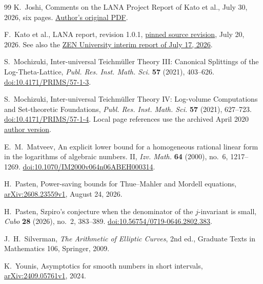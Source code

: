 \documentclass[11pt]{amsart}
\theoremstyle{definition}
\theoremstyle{remark}
\begin{document}
\begin{thebibliography}{99}
K.~Joshi, Comments on the LANA Project Report of Kato et al.,
July 30, 2026, six pages.
\href{https://sites.arizona.edu/kirti-joshi/files/2026/07/Comments-on-the-LANA-Project-Report-of-Kato-et-al.pdf}{Author's original PDF}.

F.~Kato et al., LANA report, revision 1.0.1,
\href{https://github.com/katobungen/LANA_report_202607/tree/293bdd89463473ae13d40834d70fb4b7ba81da1f}{pinned source revision}, July 20, 2026.
See also the \href{https://zen.ac.jp/news/zmcpostevent0717e}{ZEN University
interim report of July 17, 2026}.

S.~Mochizuki, Inter-universal Teichm\"uller Theory III:
Canonical Splittings of the Log-Theta-Lattice,
\emph{Publ. Res. Inst. Math. Sci.} \textbf{57} (2021), 403--626.
\href{https://doi.org/10.4171/PRIMS/57-1-3}{doi:10.4171/PRIMS/57-1-3}.

S.~Mochizuki, Inter-universal Teichm\"uller Theory IV:
Log-volume Computations and Set-theoretic Foundations,
\emph{Publ. Res. Inst. Math. Sci.} \textbf{57} (2021), 627--723.
\href{https://doi.org/10.4171/PRIMS/57-1-4}{doi:10.4171/PRIMS/57-1-4}.
Local page references use the archived April 2020
\href{https://www.kurims.kyoto-u.ac.jp/~motizuki/Inter-universal%20Teichmuller%20Theory%20IV.pdf}{author version}.

E.~M.~Matveev, An explicit lower bound for a homogeneous rational linear
form in the logarithms of algebraic numbers. II,
\emph{Izv. Math.} \textbf{64} (2000), no.~6, 1217--1269.
\href{https://doi.org/10.1070/IM2000v064n06ABEH000314}{doi:10.1070/IM2000v064n06ABEH000314}.

H.~Pasten, Power-saving bounds for Thue--Mahler and Mordell equations,
\href{https://arxiv.org/abs/2608.23559v1}{arXiv:2608.23559v1}, August 24, 2026.

H.~Pasten, Szpiro's conjecture when the denominator of the $j$-invariant
is small, \emph{Cubo} \textbf{28} (2026), no.~2, 383--389.
\href{https://doi.org/10.56754/0719-0646.2802.383}{doi:10.56754/0719-0646.2802.383}.

J.~H.~Silverman, \emph{The Arithmetic of Elliptic Curves},
2nd ed., Graduate Texts in Mathematics 106, Springer, 2009.

K.~Younis, Asymptotics for smooth numbers in short intervals,
\href{https://arxiv.org/abs/2409.05761v1}{arXiv:2409.05761v1}, 2024.

\end{thebibliography}
\end{document}
